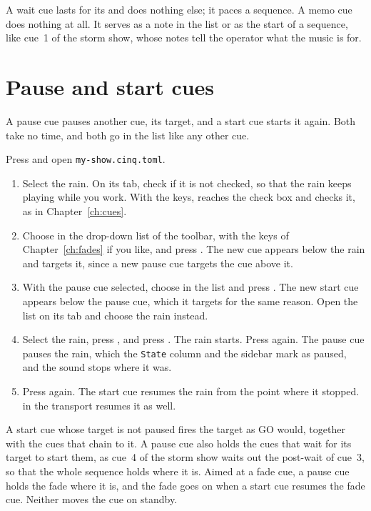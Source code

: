 A wait cue lasts for its  and does nothing else; it paces a
sequence.  A memo cue does nothing at all.  It serves as a note in the list
or as the start of a sequence, like cue~1 of the storm show, whose notes tell
the operator what the music is for.

\section{Pause and start cues}

A pause cue pauses another cue, its target, and a start cue starts it again.
Both take no time, and both go in the list like any other cue.

Press  and open \texttt{my-show.cinq.toml}.

\begin{enumerate}
\item Select the rain.  On its  tab, check  if it is not checked, so that the rain keeps playing
  while you work.  With the keys,  reaches the check box and
   checks it, as in Chapter~\ref{ch:cues}.
\item Choose  in the  drop-down list of the toolbar,
  with the keys of Chapter~\ref{ch:fades} if you like, and press
  \@.  The new cue appears below the rain and targets it, since a
  new pause cue targets the cue above it.
\item With the pause cue selected, choose  in the  list
  and press \@.  The new start cue appears below the pause cue,
  which it targets for the same reason.  Open the  list on its
   tab and choose the rain instead.
\item Select the rain, press , and press \@.  The
  rain starts.  Press  again.  The pause cue pauses the rain, which
  the \texttt{State} column and the sidebar mark as paused, and the sound
  stops where it was.
\item Press  again.  The start cue resumes the rain from the point
  where it stopped.   in the transport resumes it as well.
\end{enumerate}

A start cue whose target is not paused fires the target as GO would, together
with the cues that chain to it.  A pause cue also holds the cues that wait
for its target to start them, as cue~4 of the storm show waits out the
post-wait of cue~3, so that the whole sequence holds where it is.  Aimed at a
fade cue, a pause cue holds the fade where it is, and the fade goes on when a
start cue resumes the fade cue.  Neither moves the cue on standby.

